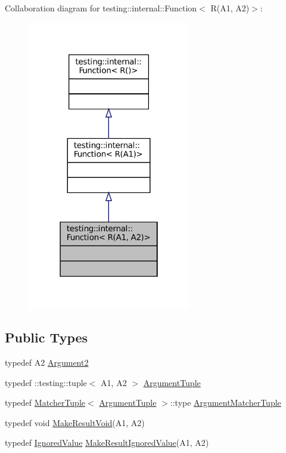 Collaboration diagram for testing\+:\+:internal\+:\+:Function$<$ R(A1, A2)$>$\+:
\nopagebreak
\begin{figure}[H]
\begin{center}
\leavevmode
\includegraphics[width=202pt]{structtesting_1_1internal_1_1Function_3_01R_07A1_00_01A2_08_4__coll__graph}
\end{center}
\end{figure}
\subsection*{Public Types}
\begin{DoxyCompactItemize}
\item 
typedef A2 \hyperlink{structtesting_1_1internal_1_1Function_3_01R_07A1_00_01A2_08_4_a025f5192252366d73aa19718bb0ea89d}{Argument2}
\item 
typedef \+::testing\+::tuple$<$ A1, A2 $>$ \hyperlink{structtesting_1_1internal_1_1Function_3_01R_07A1_00_01A2_08_4_a2de00437877c29ec6cb78396928b8e3e}{Argument\+Tuple}
\item 
typedef \hyperlink{structtesting_1_1internal_1_1MatcherTuple}{Matcher\+Tuple}$<$ \hyperlink{structtesting_1_1internal_1_1Function_3_01R_07_08_4_ad483c3128c470d8cdb55c3ac1c575c11}{Argument\+Tuple} $>$\+::type \hyperlink{structtesting_1_1internal_1_1Function_3_01R_07A1_00_01A2_08_4_ad07042129ff6370f55a279ad12f5e80f}{Argument\+Matcher\+Tuple}
\item 
typedef void \hyperlink{structtesting_1_1internal_1_1Function_3_01R_07A1_00_01A2_08_4_ada1ad22fa21c84ec3faea47ed20c1b46}{Make\+Result\+Void}(A1, A2)
\item 
typedef \hyperlink{classtesting_1_1internal_1_1IgnoredValue}{Ignored\+Value} \hyperlink{structtesting_1_1internal_1_1Function_3_01R_07A1_00_01A2_08_4_a89033ea870fe831b13899ce36666e102}{Make\+Result\+Ignored\+Value}(A1, A2)
\end{DoxyCompactItemize}


